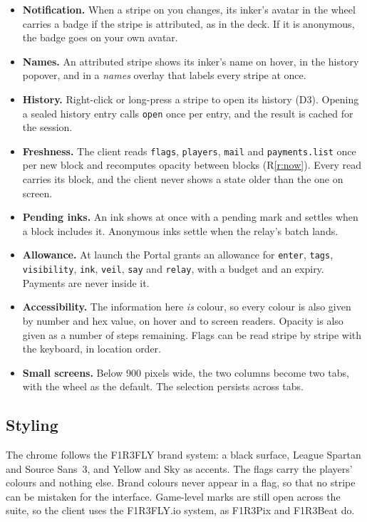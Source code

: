 \documentclass[11pt,a4paper]{article}
\newcommand{\code}[1]{\texttt{#1}}
\begin{document}
\begin{itemize}[leftmargin=1.2em,itemsep=2pt]
\item \textbf{Notification.} When a stripe on you changes, its inker's avatar in the wheel
  carries a badge if the stripe is attributed, as in the deck. If it is anonymous, the badge
  goes on your own avatar.
\item \textbf{Names.} An attributed stripe shows its inker's name on hover, in the history
  popover, and in a \emph{names} overlay that labels every stripe at once.
\item \textbf{History.} Right-click or long-press a stripe to open its history (D3). Opening a
  sealed history entry calls \code{open} once per entry, and the result is cached for the
  session.
\item \textbf{Freshness.} The client reads \code{flags}, \code{players}, \code{mail} and
  \code{payments.list} once per new block and recomputes opacity between blocks
  (R\ref{r:now}). Every read carries its block, and the client never shows a state older than
  the one on screen.
\item \textbf{Pending inks.} An ink shows at once with a pending mark and settles when a block
  includes it. Anonymous inks settle when the relay's batch lands.
\item \textbf{Allowance.} At launch the Portal grants an allowance for \code{enter},
  \code{tags}, \code{visibility}, \code{ink}, \code{veil}, \code{say} and \code{relay}, with a
  budget and an expiry. Payments are never inside it.
\item \textbf{Accessibility.} The information here \emph{is} colour, so every colour is also
  given by number and hex value, on hover and to screen readers. Opacity is also given as a
  number of steps remaining. Flags can be read stripe by stripe with the keyboard, in location
  order.
\item \textbf{Small screens.} Below 900 pixels wide, the two columns become two tabs, with the
  wheel as the default. The selection persists across tabs.
\end{itemize}

\subsection{Styling}

The chrome follows the F1R3FLY brand system: a black surface, League Spartan and Source Sans~3,
and Yellow and Sky as accents. The flags carry the players' colours and nothing else. Brand
colours never appear in a flag, so that no stripe can be mistaken for the interface. Game-level
marks are still open across the suite, so the client uses the F1R3FLY.io system, as F1R3Pix and
F1R3Beat do.
\end{document}
